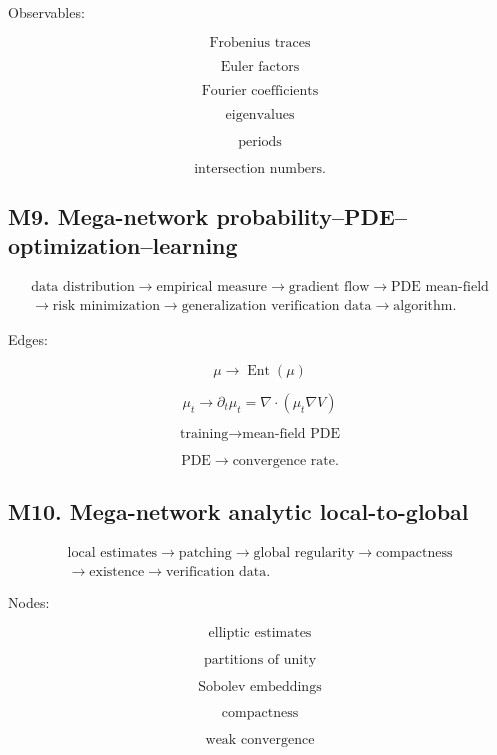 \documentclass[11pt]{article}
\begin{document}
Observables:

\[
\text{Frobenius traces}
\]

\[
\text{Euler factors}
\]

\[
\text{Fourier coefficients}
\]

\[
\text{eigenvalues}
\]

\[
\text{periods}
\]

\[
\text{intersection numbers}.
\]



\subsection{M9. Mega-network probability--PDE--optimization--learning}

\[
\begin{gathered}
\text{data distribution} \to \text{empirical measure} \to \text{gradient flow} \to \text{PDE mean-field} \\
\to \text{risk minimization} \to \text{generalization verification data} \to \text{algorithm}.
\end{gathered}
\]

Edges:

\[
\mu\to \operatorname{Ent}(\mu)
\]

\[
\mu_t\to \partial_t\mu_t=\nabla\cdot(\mu_t\nabla V)
\]

\[
\text{training}\to \text{mean-field PDE}
\]

\[
\text{PDE}\to \text{convergence rate}.
\]



\subsection{M10. Mega-network analytic local-to-global}

\[
\begin{gathered}
\text{local estimates} \to \text{patching} \to \text{global regularity} \to \text{compactness} \\
\to \text{existence} \to \text{verification data}.
\end{gathered}
\]

Nodes:

\[
\text{elliptic estimates}
\]

\[
\text{partitions of unity}
\]

\[
\text{Sobolev embeddings}
\]

\[
\text{compactness}
\]

\[
\text{weak convergence}
\]
\end{document}
